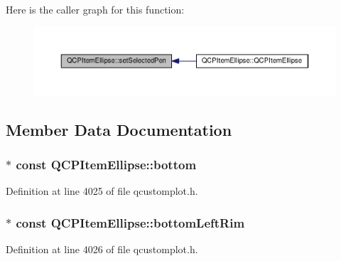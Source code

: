 Here is the caller graph for this function\+:\nopagebreak
\begin{figure}[H]
\begin{center}
\leavevmode
\includegraphics[width=350pt]{class_q_c_p_item_ellipse_a6c542fba1dc918041c583f58a50dde99_icgraph}
\end{center}
\end{figure}




\subsection{Member Data Documentation}
\hypertarget{class_q_c_p_item_ellipse_a2dc80ff9f5db600eae0133bdde65066f}{}
\subsubsection[{bottom}]{$\ast$ const Q\+C\+P\+Item\+Ellipse\+::bottom}\label{class_q_c_p_item_ellipse_a2dc80ff9f5db600eae0133bdde65066f}


Definition at line 4025 of file qcustomplot.\+h.

\hypertarget{class_q_c_p_item_ellipse_a31f31a9e9f9098c90fb47573094276c5}{}
\subsubsection[{bottom\+Left\+Rim}]{$\ast$ const Q\+C\+P\+Item\+Ellipse\+::bottom\+Left\+Rim}\label{class_q_c_p_item_ellipse_a31f31a9e9f9098c90fb47573094276c5}


Definition at line 4026 of file qcustomplot.\+h.

\hypertarget{class_q_c_p_item_ellipse_ab73c8deafc0d8d1ef7d75b6cdcc37159}{}
